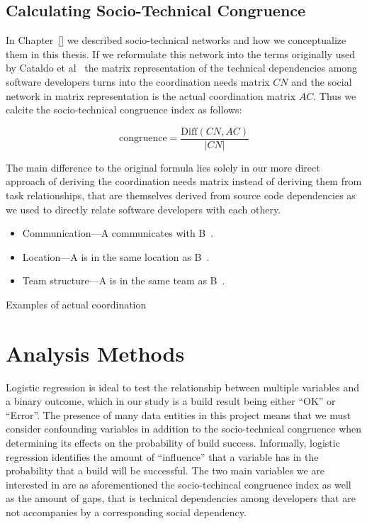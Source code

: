 \subsection{Calculating Socio-Technical Congruence}
\label{sec:stc}
In Chapter~\ref{} we described socio-technical networks and how we conceptualize them in this thesis.
If we reformulate this network into the terms originally used by Cataldo et al~\cite{} the matrix representation of the technical dependencies among software developers turns into the coordination needs matrix $CN$ and the social network in matrix representation is the actual coordination matrix $AC$.
Thus we calcite the socio-technical congruence index as follows:

\[ \text{congruence} = \frac{\text{Diff}(CN, AC)}  {|CN|} \]

The main difference to the original formula lies solely in our more direct approach of deriving the coordination needs matrix instead of deriving them from task relationships, that are themselves derived from source code dependencies as we used to directly relate software developers with each othery.

\begin{placeholder}[t]
\begin{itemize}
\item Communication---A communicates with B~\cite{cataldo:cscw:2006, ehrlich2008:gaps, cataldo:esem:2008,damian2007:collaboration}.
\item Location---A is in the same location as B~\cite{cataldo:cscw:2006, ehrlich2008:gaps}.
\item Team structure---A is in the same team as B~\cite{cataldo:cscw:2006}.
\end{itemize}
\caption{Examples of actual coordination}
\label{ph:relationships}
\end{placeholder}


\section{Analysis Methods}
\label{sec:methodology}
Logistic regression is ideal to test the relationship between multiple variables and a binary outcome, which in our study is a build result being either ``OK'' or ``Error''. The presence of many data entities in this project means that we must consider confounding variables in addition to the socio-technical congruence when determining its effects on the probability of build success. Informally, logistic regression identifies the amount of ``influence'' that a variable has in the probability that a build will be successful.
The two main variables we are interested in are as aforementioned the socio-techincal congruence index as well as the amount of gaps, that is technical dependencies among developers that are not accompanies by a corresponding social dependency.

